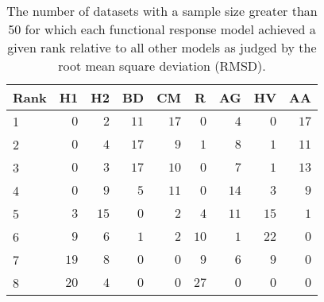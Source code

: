 \begin{table}[!tbp]
\caption{The number of datasets with a sample size greater than 50 for which each functional response model achieved a given rank relative to all other models as judged by the root mean square deviation (RMSD).\label{table:RMSD_rankings_top50}} 
\begin{center}
\begin{tabular}{lrrrrrrrr}
\hline\hline
\multicolumn{1}{l}{Rank}&\multicolumn{1}{c}{H1}&\multicolumn{1}{c}{H2}&\multicolumn{1}{c}{BD}&\multicolumn{1}{c}{CM}&\multicolumn{1}{c}{R}&\multicolumn{1}{c}{AG}&\multicolumn{1}{c}{HV}&\multicolumn{1}{c}{AA}\tabularnewline
\hline
1&$ 0$&$ 2$&$11$&$17$&$ 0$&$ 4$&$ 0$&$17$\tabularnewline
2&$ 0$&$ 4$&$17$&$ 9$&$ 1$&$ 8$&$ 1$&$11$\tabularnewline
3&$ 0$&$ 3$&$17$&$10$&$ 0$&$ 7$&$ 1$&$13$\tabularnewline
4&$ 0$&$ 9$&$ 5$&$11$&$ 0$&$14$&$ 3$&$ 9$\tabularnewline
5&$ 3$&$15$&$ 0$&$ 2$&$ 4$&$11$&$15$&$ 1$\tabularnewline
6&$ 9$&$ 6$&$ 1$&$ 2$&$10$&$ 1$&$22$&$ 0$\tabularnewline
7&$19$&$ 8$&$ 0$&$ 0$&$ 9$&$ 6$&$ 9$&$ 0$\tabularnewline
8&$20$&$ 4$&$ 0$&$ 0$&$27$&$ 0$&$ 0$&$ 0$\tabularnewline
\hline
\end{tabular}\end{center}
\end{table}
